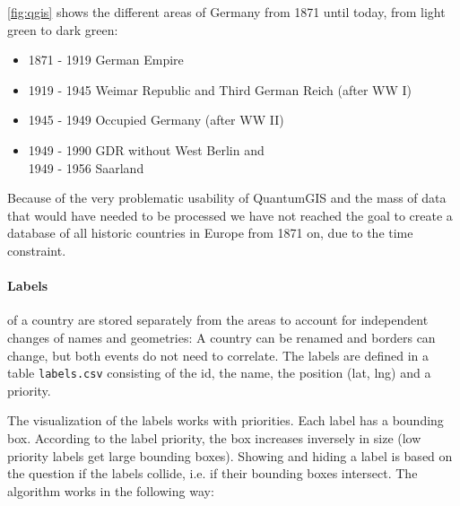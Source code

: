 \ref{fig:qgis} shows the different areas of Germany from 1871 until today, from light green to dark green:

\begin{itemize}
  \item 1871 - 1919 German Empire
  \item 1919 - 1945 Weimar Republic and Third German Reich (after WW I)
  \item 1945 - 1949 Occupied Germany (after WW II)
  \item 1949 - 1990 GDR without West Berlin and \\
        1949 - 1956 Saarland
\end{itemize}

Because of the very problematic usability of QuantumGIS and the mass of data that would have needed to be processed we have not reached the goal to create a database of all historic countries in Europe from 1871 on, due to the time constraint.

\paragraph{Labels} of a country are stored separately from the areas to account for independent changes of names and geometries: A country can be renamed and borders can change, but both events do not need to correlate. The labels are defined in a table \texttt{labels.csv} consisting of the id, the name, the position (lat, lng) and a priority.

The visualization of the labels works with priorities. Each label has a bounding box. According to the label priority, the box increases inversely in size (low priority labels get large bounding boxes). Showing and hiding a label is based on the question if the labels collide, i.e. if their bounding boxes intersect. The algorithm works in the following way:

